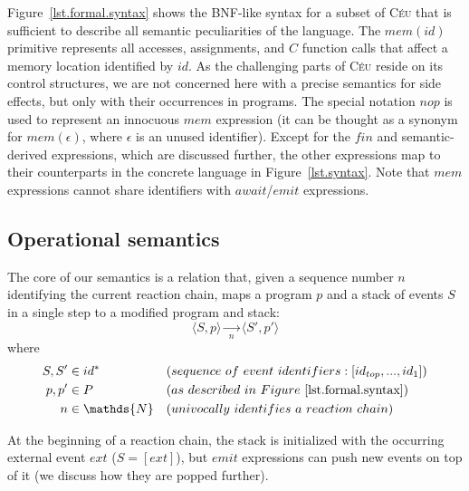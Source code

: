 \documentclass{sigplanconf}
\newcommand{\CEU}{\textsc{C\'{e}u}\xspace}
\newcommand{\code}[1] {{\small{\texttt{#1}}}}
\newcommand{\LL}{\langle}
\newcommand{\RR}{\rangle}
\newcommand{\1}{\;}
\newcommand{\2}{\;\;}
\newcommand{\3}{\;\;\;}
\newcommand{\5}{\;\;\;\;\;}
\begin{document}
Figure~\ref{lst.formal.syntax} shows the BNF-like syntax for a subset of \CEU 
that is sufficient to describe all semantic peculiarities of the language.
%
The $mem(id)$ primitive represents all accesses, assignments, and $C$ function 
calls that affect a memory location identified by $id$.
As the challenging parts of \CEU reside on its control structures, we are not 
concerned here with a precise semantics for side effects, but only with their 
occurrences in programs.
%
The special notation $nop$ is used to represent an innocuous $mem$ expression 
(it can be thought as a synonym for $mem(\epsilon)$, where $\epsilon$ is an 
unused identifier).
%
Except for the $fin$ and semantic-derived expressions, which are discussed 
further, the other expressions map to their counterparts in the concrete 
language in Figure~\ref{lst.syntax}.
%
Note that $mem$ expressions cannot share identifiers with $await$/$emit$ 
expressions.

\subsection{Operational semantics}
\label{sec.sem}

The core of our semantics is a relation that, given a sequence number $n$ 
identifying the current reaction chain, maps a program $p$ and a stack of 
events $S$ in a single step to a modified program and stack:
%
$$
\LL S, p \RR
    \xrightarrow[~~n~~]{}
\LL S', p' \RR
$$
%
where
%
\begin{align*}
S, S' &\in id^*
    &&(sequence~of~event~identifiers: [id_{top}, ..., id_1]) \\
p, p' &\in P
    && (as~described~in~Figure~\ref{lst.formal.syntax}) \\
n     &\in \mathds{N}
    && (univocally~identifies~a~reaction~chain)
\end{align*}

At the beginning of a reaction chain, the stack is initialized with the 
occurring external event $ext$ ($S=[ext]$), but $emit$ expressions can push new 
events on top of it (we discuss how they are popped further).

%
%
\end{document}
